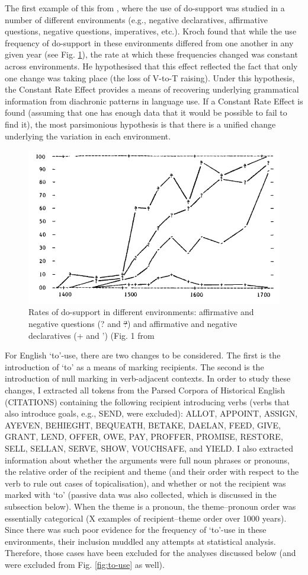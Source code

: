 	The first example of this from \cite{Kroch.1989}, where the use of do-support was studied in a number of different environments (e.g., negative declaratives, affirmative questions, negative questions, imperatives, etc.). Kroch found that while the use frequency of do-support in these environments differed from one another in any given year (see Fig. \ref{fig:kroch-graph}), the rate at which these frequencies changed was constant across environments. He hypothesised that this effect reflected the fact that only one change was taking place (the loss of V-to-T raising). Under this hypothesis, the Constant Rate Effect provides a means of recovering underlying grammatical information from diachronic patterns in language use. If a Constant Rate Effect is found (assuming that one has enough data that it would be possible to fail to find it), the most parsimonious hypothesis is that there is a unified change underlying the variation in each environment.

	\begin{figure}[ht!]
		\includegraphics[width=.5\linewidth]{../images/kroch-graph}
		\caption{Rates of do-support in different environments: affirmative and negative questions (? and \sout{?}) and affirmative and negative declaratives (+ and ') (Fig. 1 from \citealt{Kroch.1989}}
		\label{fig:kroch-graph}
	\end{figure}

	For English `to'-use, there are two changes to be considered. The first is the introduction of `to' as a means of marking recipients. The second is the introduction of null marking in verb-adjacent contexts. In order to study these changes, I extracted all tokens from the Parsed Corpora of Historical English (CITATIONS) containing the following recipient introducing verbs (verbs that also introduce goals, e.g., SEND, were excluded): ALLOT, APPOINT, ASSIGN, AYEVEN, BEHIEGHT, BEQUEATH, BETAKE, DAELAN, FEED, GIVE, GRANT, LEND, OFFER, OWE, PAY, PROFFER, PROMISE, RESTORE, SELL, SELLAN, SERVE, SHOW, VOUCHSAFE, and YIELD. I also extracted information about whether the arguments were full noun phrases or pronouns, the relative order of the recipient and theme (and their order with respect to the verb to rule out cases of topicalisation), and whether or not the recipient was marked with `to' (passive data was also collected, which is discussed in the subsection below). When the theme is a pronoun, the theme--pronoun order was essentially categorical (X examples of recipient--theme order over 1000 years). Since there was such poor evidence for the frequency of `to'-use in these environments, their inclusion muddled any attempts at statistical analysis. Therefore, those cases have been excluded for the analyses discussed below (and were excluded from Fig. \ref{fig:to-use} as well).

